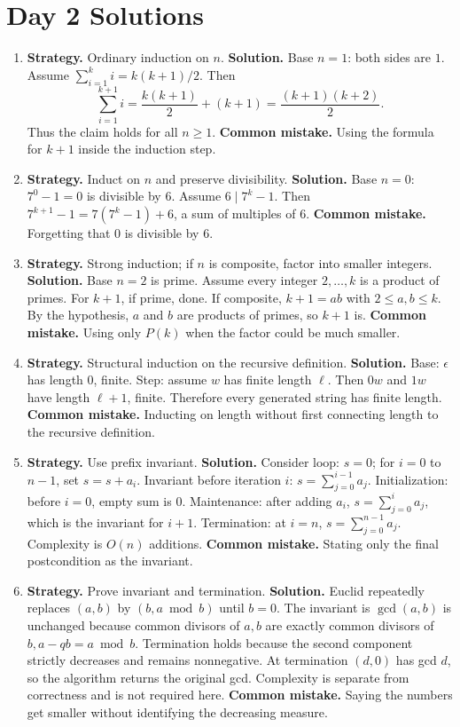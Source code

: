 \documentclass[11pt]{article}
\begin{document}
\section{Day 2 Solutions}
\begin{enumerate}[label=\textbf{2.\arabic*.}]
\item \textbf{Strategy.} Ordinary induction on $n$. \textbf{Solution.} Base $n=1$: both sides are $1$. Assume $\sum_{i=1}^k i=k(k+1)/2$. Then
\[
\sum_{i=1}^{k+1}i=\frac{k(k+1)}2+(k+1)=\frac{(k+1)(k+2)}2.
\]
Thus the claim holds for all $n\ge1$. \textbf{Common mistake.} Using the formula for $k+1$ inside the induction step.

\item \textbf{Strategy.} Induct on $n$ and preserve divisibility. \textbf{Solution.} Base $n=0$: $7^0-1=0$ is divisible by $6$. Assume $6\mid 7^k-1$. Then $7^{k+1}-1=7(7^k-1)+6$, a sum of multiples of $6$. \textbf{Common mistake.} Forgetting that $0$ is divisible by $6$.

\item \textbf{Strategy.} Strong induction; if $n$ is composite, factor into smaller integers. \textbf{Solution.} Base $n=2$ is prime. Assume every integer $2,\ldots,k$ is a product of primes. For $k+1$, if prime, done. If composite, $k+1=ab$ with $2\le a,b\le k$. By the hypothesis, $a$ and $b$ are products of primes, so $k+1$ is. \textbf{Common mistake.} Using only $P(k)$ when the factor could be much smaller.

\item \textbf{Strategy.} Structural induction on the recursive definition. \textbf{Solution.} Base: $\epsilon$ has length $0$, finite. Step: assume $w$ has finite length $\ell$. Then $0w$ and $1w$ have length $\ell+1$, finite. Therefore every generated string has finite length. \textbf{Common mistake.} Inducting on length without first connecting length to the recursive definition.

\item \textbf{Strategy.} Use prefix invariant. \textbf{Solution.} Consider loop: $s=0$; for $i=0$ to $n-1$, set $s=s+a_i$. Invariant before iteration $i$: $s=\sum_{j=0}^{i-1}a_j$. Initialization: before $i=0$, empty sum is $0$. Maintenance: after adding $a_i$, $s=\sum_{j=0}^{i}a_j$, which is the invariant for $i+1$. Termination: at $i=n$, $s=\sum_{j=0}^{n-1}a_j$. Complexity is $O(n)$ additions. \textbf{Common mistake.} Stating only the final postcondition as the invariant.

\item \textbf{Strategy.} Prove invariant and termination. \textbf{Solution.} Euclid repeatedly replaces $(a,b)$ by $(b,a\bmod b)$ until $b=0$. The invariant is $\gcd(a,b)$ is unchanged because common divisors of $a,b$ are exactly common divisors of $b,a-qb=a\bmod b$. Termination holds because the second component strictly decreases and remains nonnegative. At termination $(d,0)$ has gcd $d$, so the algorithm returns the original gcd. Complexity is separate from correctness and is not required here. \textbf{Common mistake.} Saying the numbers get smaller without identifying the decreasing measure.
\end{enumerate}
\end{document}

